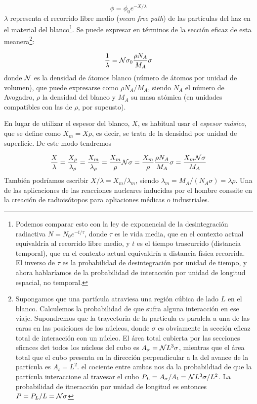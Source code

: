 \begin{equation}
    \phi = \phi_0 e^{-X/\lambda}
\end{equation}
$\lambda$ representa el recorrido libre medio (\textit{mean free path}) de las partículas del haz en el material del blanco\footnote{Podemos comparar esto con la ley de exponencial de la desintegración radiactiva $N=N_0 e^{-t/\tau}$, donde $\tau$ es le vida media, que en el contexto actual equivaldría al recorrido libre medio, y $t$ es el tiempo trascurrido (distancia temporal), que en el contexto actual equivaldría a distancia física recorrida. El inverso de $\tau$ es la probabilidad de desintegración por unidad de tiempo, y ahora hablaríamos de la probabilidad de interacción por unidad de longitud espacial, no temporal.}. Se puede expresar en términos de la sección eficaz de esta meanera\footnote{Supongamos que una partícula atraviesa una región cúbica de lado $L$ en el blanco. Calculemos la probabilidad de que sufra alguna interacción en ese viaje. Supondremos que la trayectoria de la partícula es paralela a una de las caras en las posiciones de los núcleos, donde $\sigma$ es obviamente la sección eficaz total de interacción con un núcleo. El área total cubierta por las secciones eficaces det todos los núcleos del cubo es $A_\sigma = \mathcal{N} L^3 \sigma$, mientras que el área total que el cubo presenta en la dirección perpendicular a la del avance de la partícula es $A_t=L^2$. el cociente entre ambas nos da la probabildiad de que la partícula interaccione al travesar el cubo $P_L  = A_\sigma / A_t = \mathcal{N} L^3 \sigma / L^2$. La probabilidad de itneracción por unidad de longitud es entonces $P=P_L/L=\mathcal{N} \sigma$}: \\

\Revisar

\begin{equation}
    \frac{1}{\lambda} = \mathcal{N} \sigma_0 \frac{\rho N_A }{M_A} \sigma 
\end{equation}
donde $\mathcal{N}$ es la densidad de átomos blanco (número de átomos por unidad de volumen), que puede expresarse como $\rho N_A /M_A$, siendo $N_A$ el número de Avogadro, $\rho$ la densidad del blanco y $M_A$ su masa atómica (en unidades compatibles con las de $\rho$, por supeusto). 

En lugar de utilizar el espesor del blanco, $X$, es habitual usar el \textit{espesor másico}, que se define como $X_m=X\rho$, es decir, se trata de la densidad por unidad de superficie. De este modo tendremos 

\begin{equation}
    \frac{X}{\lambda} = \frac{X_\rho}{\lambda_\rho} = \frac{X_m}{\lambda_\rho} = \frac{X_m}{\rho} \mathcal{N} \sigma = \frac{X_m}{\rho} \frac{\rho N_A}{M_A} \sigma = \frac{X_m \mathcal{N} \sigma}{M_A}
\end{equation}
También podríamos escribir $X/\lambda=X_m/\lambda_m$, siendo $\lambda_m = M_A /(N_A\sigma)=\lambda \rho$. Una de las aplicaciones de las reacciones nucleares inducidas por el hombre conssite en la creación de radioisótopos para apliaciones médicas o industriales.



